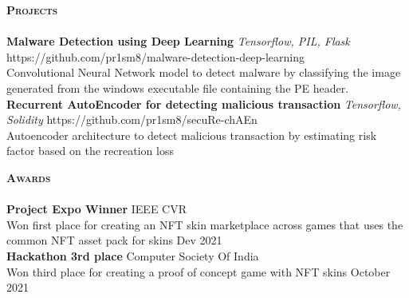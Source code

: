 \documentclass[a4paper]{article}
\newcommand{\lineunder} {
    \vspace*{-8pt} \\
    \hspace*{-18pt} \hrulefill \\
}
\newcommand{\header} [1] {
    {\hspace*{-18pt}\vspace*{6pt} \textbf{\textsc{#1}}}
    \vspace*{-6pt} \lineunder
}
\begin{document}
\header{Projects}
{\textbf{Malware Detection using Deep Learning}} {\sl Tensorflow, PIL, Flask} \hfill https://github.com/pr1sm8/malware-detection-deep-learning\\
Convolutional Neural Network model to detect malware by classifying the image generated from the windows executable file containing the PE header.\\
\vspace*{2mm}
{\textbf{Recurrent AutoEncoder for detecting malicious transaction}} {\sl Tensorflow, Solidity} \hfill https://github.com/pr1sm8/secuRe-chAEn\\
Autoencoder architecture to detect malicious transaction by estimating risk factor based on the recreation loss\\
\vspace*{2mm}

\header{Awards}
\textbf{Project Expo Winner} \hfill IEEE CVR\\
Won first place for creating an NFT skin marketplace across games that uses the common NFT asset pack for skins \hfill Dev 2021\\
\vspace*{2mm}
\textbf{Hackathon 3rd place} \hfill Computer Society Of India\\
Won third place for creating a proof of concept game with NFT skins \hfill October 2021\\
\vspace*{2mm}

\ 
\end{document}
